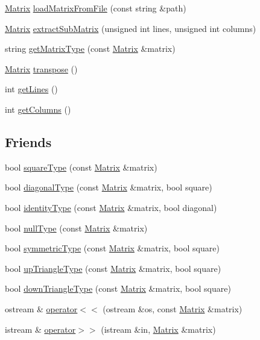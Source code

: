 \begin{DoxyCompactItemize}
\hyperlink{class_matrix}{Matrix} \hyperlink{class_matrix_aeef502e91c5f815b9a99525c0c55f741}{load\-Matrix\-From\-File} (const string \&path)
\item 
\hyperlink{class_matrix}{Matrix} \hyperlink{class_matrix_aeaa460b51a3e8ba810c4caa86427429b}{extract\-Sub\-Matrix} (unsigned int lines, unsigned int columns)
\item 
string \hyperlink{class_matrix_a0a730222578ce4b86e2166dfe8d402d2}{get\-Matrix\-Type} (const \hyperlink{class_matrix}{Matrix} \&matrix)
\item 
\hyperlink{class_matrix}{Matrix} \hyperlink{class_matrix_ae23f817021383e3c8636a714dcba1d21}{transpose} ()
\item 
int \hyperlink{class_matrix_acc315708bcdb54795a686b91277f5bdf}{get\-Lines} ()
\item 
int \hyperlink{class_matrix_a324b4057cd6e2167687e406abd720020}{get\-Columns} ()
\end{DoxyCompactItemize}
\subsection*{Friends}
\begin{DoxyCompactItemize}
\item 
bool \hyperlink{class_matrix_ac308d2d0cd1651df117cd293f4a062ec}{square\-Type} (const \hyperlink{class_matrix}{Matrix} \&matrix)
\item 
bool \hyperlink{class_matrix_a8f168d2d101b11060ff7665b718dbd00}{diagonal\-Type} (const \hyperlink{class_matrix}{Matrix} \&matrix, bool square)
\item 
bool \hyperlink{class_matrix_a53225b6314572edc7c8d855d359c9395}{identity\-Type} (const \hyperlink{class_matrix}{Matrix} \&matrix, bool diagonal)
\item 
bool \hyperlink{class_matrix_ad324d8057612009e306716ff6f944d8d}{null\-Type} (const \hyperlink{class_matrix}{Matrix} \&matrix)
\item 
bool \hyperlink{class_matrix_a6952b686de4d766d5e6071ea05ce1e5e}{symmetric\-Type} (const \hyperlink{class_matrix}{Matrix} \&matrix, bool square)
\item 
bool \hyperlink{class_matrix_add887b389e9c6a532fd0de569ded15e1}{up\-Triangle\-Type} (const \hyperlink{class_matrix}{Matrix} \&matrix, bool square)
\item 
bool \hyperlink{class_matrix_a9bca4cd9ce5dbee1a08831254b359093}{down\-Triangle\-Type} (const \hyperlink{class_matrix}{Matrix} \&matrix, bool square)
\item 
ostream \& \hyperlink{class_matrix_a85a2865bcc2b7c641162bbd4aa13a7c6}{operator$<$$<$} (ostream \&os, const \hyperlink{class_matrix}{Matrix} \&matrix)
\item 
istream \& \hyperlink{class_matrix_a65e4cbf2651c384b15830e97747feebc}{operator$>$$>$} (istream \&in, \hyperlink{class_matrix}{Matrix} \&matrix)
\end{DoxyCompactItemize}


